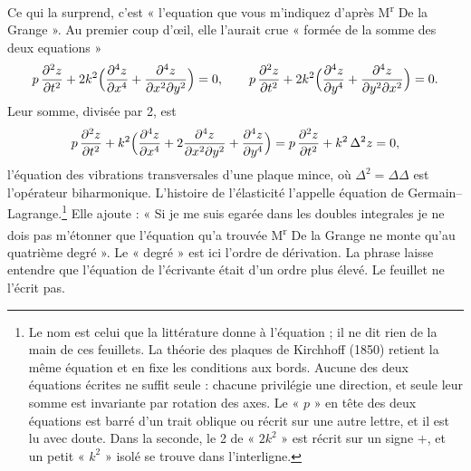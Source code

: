 \documentclass[11pt,a4paper]{article}
\begin{document}
Ce qui la surprend, c'est « l'equation que vous m'indiquez d'après
M\textsuperscript{r} De la Grange ». Au premier coup d'œil, elle l'aurait crue
« formée de la somme des deux equations »
\[
p\,\frac{\partial^2z}{\partial t^2}+2k^2\Bigl(\frac{\partial^4z}{\partial x^4}+\frac{\partial^4z}{\partial x^2\partial y^2}\Bigr)=0,
\qquad
p\,\frac{\partial^2z}{\partial t^2}+2k^2\Bigl(\frac{\partial^4z}{\partial y^4}+\frac{\partial^4z}{\partial y^2\partial x^2}\Bigr)=0 .
\]
Leur somme, divisée par 2, est
\[
p\,\frac{\partial^2z}{\partial t^2}+k^2\Bigl(\frac{\partial^4z}{\partial x^4}+2\frac{\partial^4z}{\partial x^2\partial y^2}+\frac{\partial^4z}{\partial y^4}\Bigr)
=p\,\frac{\partial^2z}{\partial t^2}+k^2\,\Delta^2z=0,
\]
l'équation des vibrations transversales d'une plaque mince, où
\(\Delta^2=\Delta\Delta\) est l'opérateur biharmonique. L'histoire de
l'élasticité l'appelle équation de Germain–Lagrange.\footnote{Le nom est celui
que la littérature donne à l'équation ; il ne dit rien de la main de ces
feuillets. La théorie des plaques de Kirchhoff (1850) retient la même équation
et en fixe les conditions aux bords. Aucune des deux équations écrites ne
suffit seule : chacune privilégie une direction, et seule leur somme est
invariante par rotation des axes. Le « \(p\) » en tête des deux équations est
barré d'un trait oblique ou récrit sur une autre lettre, et il est lu avec
doute. Dans la seconde, le 2 de « \(2k^2\) » est récrit sur un signe \(+\), et
un petit « \(k^2\) » isolé se trouve dans l'interligne.} Elle ajoute : « Si je
me suis egarée dans les doubles integrales je ne dois pas m'étonner que
l'équation qu'a trouvée M\textsuperscript{r} De la Grange ne monte qu'au
quatrième degré ». Le « degré » est ici l'ordre de dérivation. La phrase laisse
entendre que l'équation de l'écrivante était d'un ordre plus élevé. Le
feuillet ne l'écrit pas.
\end{document}
